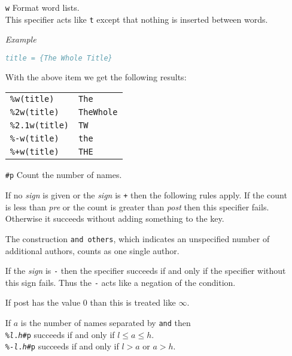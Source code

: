 \documentclass[11pt,a4paper]{scrbook}
\newenvironment{Example}{\smallskip\par\textit{Example}\par}{\smallskip\par}
\begin{document}
\begin{itemize}
  \item [\texttt{w}] Format word lists.\\
    This specifier acts like \texttt{t} except that nothing is inserted
    between words.

    \begin{Example}
      \begin{lstlisting}[language=BibTeX]
  title = {The Whole Title}
      \end{lstlisting}\vspace{-2ex}
      With the above item we get the following results:

      \begin{tabular}{ll}
        \texttt{\%w(title)}	& \texttt{The}		\\
        \texttt{\%2w(title)}	& \texttt{TheWhole}	\\
        \texttt{\%2.1w(title)}	& \texttt{TW}		\\
        \texttt{\%-w(title)}	& \texttt{the}		\\
        \texttt{\%+w(title)}	& \texttt{THE}
      \end{tabular}
    \end{Example}

  \item [\texttt{\#p}] Count the number of names.

    If no \textit{sign} is given or the \textit{sign} is \verb|+| then the
    following rules apply. If the count is less than \textit{pre} or the count
    is greater than \textit{post} then this specifier fails. Otherwise it
    succeeds without adding something to the key.

    The construction \verb|and others|, which indicates an unspecified number
    of additional authors, counts as one single author.

    If the \textit{sign} is \verb|-| then the specifier succeeds if and only
    if the specifier without this sign fails. Thus the \verb|-| acts like a
    negation of the condition.

    If post has the value 0 than this is treated like \(\infty\).

    If \(a\) is the number of names separated by \texttt{and} then\\
    \texttt{\%\textit{l}.\textit{h}\#p} succeeds if and only if
    \(l\leq a\leq h\).\\
    \texttt{\%-\textit{l}.\textit{h}\#p} succeeds if and only if \(l>a\) or
    \(a>h\).


\end{itemize}
\end{document}
